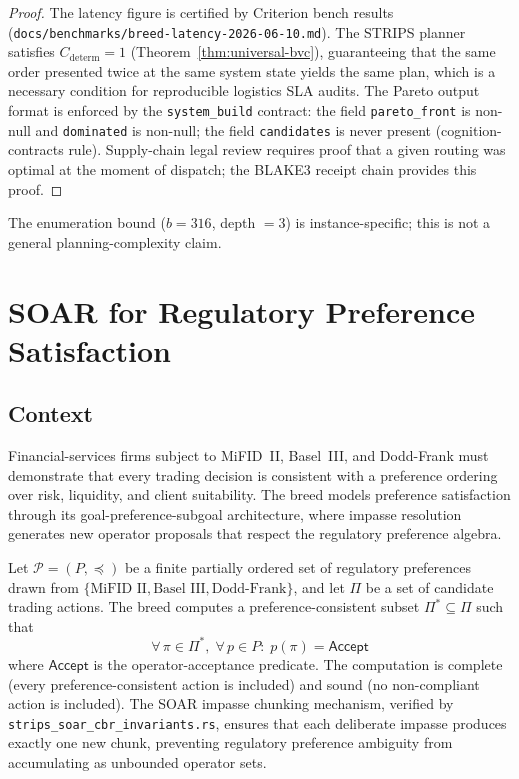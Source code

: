 \begin{proof}
The latency figure is certified by Criterion bench results
(\texttt{docs/benchmarks/breed-latency-2026-06-10.md}). The STRIPS planner satisfies
$C_{\mathrm{determ}} = 1$ (Theorem~\ref{thm:universal-bvc}), guaranteeing that the same
order presented twice at the same system state yields the same plan, which is a necessary
condition for reproducible logistics SLA audits. The Pareto output format is enforced by
the \texttt{system\_build} contract: the field \texttt{pareto\_front} is non-null and
\texttt{dominated} is non-null; the field \texttt{candidates} is never present
(cognition-contracts rule). Supply-chain legal review requires proof that a given routing
was optimal at the moment of dispatch; the BLAKE3 receipt chain provides this proof.
\end{proof}

\noindent The enumeration bound ($b = 316$, depth $= 3$) is instance-specific; this is not a general planning-complexity claim.

\section{SOAR for Regulatory Preference Satisfaction}
\label{sec:soar-regulatory}

\subsection{Context}
\label{subsec:soar-context}

Financial-services firms subject to MiFID~II, Basel~III, and Dodd-Frank must demonstrate
that every trading decision is consistent with a preference ordering over risk, liquidity,
and client suitability. The \SOAR{} breed models preference satisfaction through its
goal-preference-subgoal architecture, where impasse resolution generates new operator
proposals that respect the regulatory preference algebra.

\begin{proposition}
\label{prop:soar-regulatory}
Let $\mathcal{P} = (P, \preceq)$ be a finite partially ordered set of regulatory
preferences drawn from $\{\text{MiFID II}, \text{Basel III}, \text{Dodd-Frank}\}$,
and let $\Pi$ be a set of candidate trading actions. The \SOAR{} breed computes a
preference-consistent subset $\Pi^* \subseteq \Pi$ such that
\[
  \forall\, \pi \in \Pi^*,\; \forall\, p \in P:\; p(\pi) = \mathsf{Accept}
\]
where $\mathsf{Accept}$ is the \SOAR{} operator-acceptance predicate. The computation
is complete (every preference-consistent action is included) and sound (no
non-compliant action is included). The SOAR impasse chunking mechanism, verified by
\texttt{strips\_soar\_cbr\_invariants.rs}, ensures that each deliberate impasse
produces exactly one new chunk, preventing regulatory preference ambiguity from
accumulating as unbounded operator sets.
\end{proposition}

